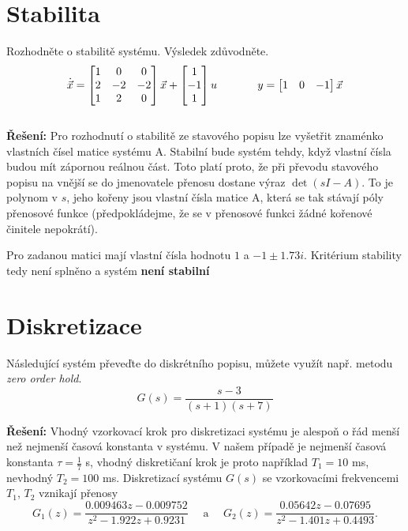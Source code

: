 \documentclass[twoside]{article}
\begin{document}
\section{Stabilita}
\label{sec:ukol6}
Rozhodněte o stabilitě systému. Výsledek zdůvodněte. \\
\begin{equation*}
	\centering
	\dot{\vec{x}} = \begin{bmatrix}
		1 & 0 & 0 \\
		2 & -2 & -2 \\
		1 & 2 & 0
	\end{bmatrix} \vec{x} + \begin{bmatrix}
		1 \\
		-1 \\
		1
\end{bmatrix} u ~~~~~~~~~~~
y = \begin{bmatrix}
	1 & 0 & -1
\end{bmatrix} \vec{x}
\end{equation*} \\
\textbf{Řešení:} Pro rozhodnutí o stabilitě ze stavového popisu lze vyšetřit znaménko vlastních čísel matice systému A.
Stabilní bude systém tehdy, když vlastní čísla budou mít zápornou reálnou část. Toto platí proto, že při převodu
stavového popisu na vnější se do jmenovatele přenosu dostane výraz $\det(sI - A)$. To je polynom v $s$, jeho kořeny
jsou vlastní čísla matice A, která se tak stávají póly přenosové funkce (předpokládejme, že se v přenosové funkci žádné kořenové činitele nepokrátí).

Pro zadanou matici mají vlastní čísla hodnotu $1$ a $ -1 \pm 1.73 i$. Kritérium stability tedy není splněno a systém \textbf{není stabilní} 


\section{Diskretizace}
\label{sec:ukol7}
Následující systém převeďte do diskrétního popisu, můžete využít např. metodu \textit{zero order hold}.
\begin{equation}
	G(s) = \frac{s-3}{(s+1)(s+7)}
\end{equation}

\textbf{Řešení:} Vhodný vzorkovací krok pro diskretizaci systému je alespoň o řád menší než nejmenší časová konstanta v systému.
V našem případě je nejmenší časová konstanta $\tau = \frac{1}{7}$ s, vhodný diskretičaní krok je proto například $T_1 = 10$ ms, nevhodný $T_2 = 100$ ms.
Diskretizací systému $G(s)$ se vzorkovacími frekvencemi $T_1$, $T_2$ vznikají přenosy
\begin{equation*}
	G_1(z) = \frac{0.009463z - 0.009752}{z^2 - 1.922z+0.9231} ~~~~~~\text{a}~~~~~~ G_2(z) = \frac{0.05642z - 0.07695}{z^2 - 1.401z+0.4493}.
\end{equation*}
\end{document}

